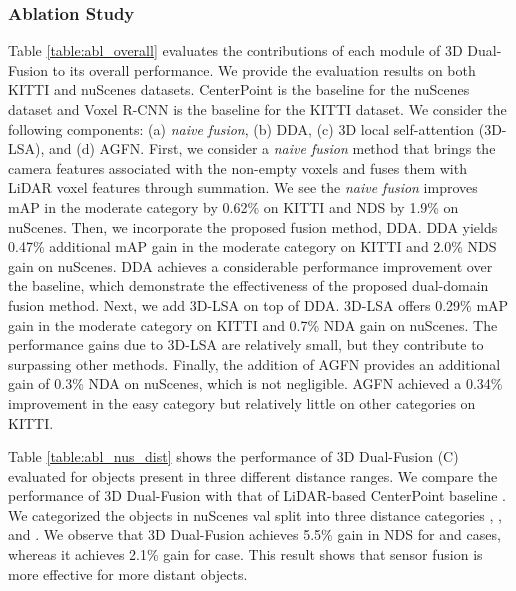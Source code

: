 \documentclass[lettersize,journal]{IEEEtran}
\begin{document}
\subsubsection{Ablation Study}
 Table \ref{table:abl_overall} evaluates the contributions of each module of 3D Dual-Fusion to its overall performance.   We provide the evaluation results on both KITTI and nuScenes datasets. CenterPoint \cite{centerpoint} is the baseline for the nuScenes dataset and Voxel R-CNN \cite{voxelrcnn} is the baseline for the KITTI dataset. 
 We consider the following components: (a) \textit{naive fusion}, (b) DDA, (c) 3D local self-attention (3D-LSA), and (d) AGFN. 
 First, we consider a {\it naive fusion} method that brings the camera features associated with the non-empty voxels  and fuses them with LiDAR voxel features through summation. We see the \textit{naive fusion} improves mAP in the moderate category by 0.62\% on KITTI and NDS by 1.9\% on nuScenes. 
 Then, we incorporate the proposed fusion method, DDA.  
 DDA yields  0.47\% additional mAP gain in the moderate category on KITTI and 2.0\% NDS gain on nuScenes. DDA achieves a considerable performance improvement over the baseline, which  
demonstrate the effectiveness of the proposed dual-domain fusion method.  Next, we add 3D-LSA on top of DDA. 3D-LSA offers 0.29\% mAP gain in the moderate category on KITTI and 0.7\% NDA gain on nuScenes. The performance gains due to 3D-LSA are relatively small, but they contribute to surpassing other methods. Finally, the addition of AGFN provides an additional gain of 0.3\% NDA on nuScenes, which is not negligible. AGFN achieved a 0.34\% improvement in the easy category but relatively little on other categories on KITTI. 

Table \ref{table:abl_nus_dist} shows the performance of 3D Dual-Fusion (C) evaluated for objects present in three different distance ranges. We compare the performance of 3D Dual-Fusion with that of LiDAR-based CenterPoint baseline \cite{centerpoint}. We categorized the objects in nuScenes val split into three distance categories , , and . We observe that 3D Dual-Fusion achieves 5.5\% gain in NDS for  and  cases, whereas it achieves 2.1\% gain for  case. 
 This result shows that sensor fusion is more effective for more distant objects.
\end{document}
